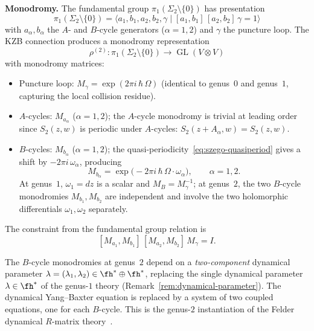 \smallskip
\noindent
\textbf{Monodromy.}
The fundamental group
$\pi_1(\Sigma_2 \setminus \{0\})$ has presentation
\begin{equation}\label{eq:fund-gp-g2}
  \pi_1(\Sigma_2 \setminus \{0\})
  = \bigl\langle
  a_1, b_1, a_2, b_2, \gamma
  \;\big|\;
  [a_1, b_1]\,[a_2, b_2]\,\gamma = 1
  \bigr\rangle
\end{equation}
with $a_\alpha, b_\alpha$ the $A$- and $B$-cycle
generators ($\alpha = 1, 2$) and $\gamma$ the puncture
loop. The KZB connection produces a monodromy
representation
\begin{equation}\label{eq:monodromy-rep-g2}
  \rho^{(2)} \colon
  \pi_1(\Sigma_2 \setminus \{0\})
  \to \operatorname{GL}(V \otimes V)
\end{equation}
with monodromy matrices:
\begin{itemize}
\item Puncture loop:
  $M_\gamma = \exp(2\pi i\,\hbar\,\Omega)$
  (identical to genus~$0$ and genus~$1$, capturing
  the local collision residue).
\item $A$-cycles:
  $M_{a_\alpha}$ ($\alpha = 1, 2$); the $A$-cycle
  monodromy is trivial at leading order since
  $S_2(z, w)$ is periodic under $A$-cycles:
  $S_2(z + A_\alpha, w) = S_2(z, w)$.
\item $B$-cycles:
  $M_{b_\alpha}$ ($\alpha = 1, 2$); the
  quasi-periodicity~\eqref{eq:szego-quasiperiod} gives
  a shift by $-2\pi i\,\omega_\alpha$, producing
  \begin{equation}\label{eq:b-monodromy-g2}
    M_{b_\alpha}
    = \exp\!\bigl(-2\pi i\,\hbar\,
    \Omega \cdot \omega_\alpha\bigr),
    \qquad \alpha = 1, 2.
  \end{equation}
  At genus~$1$, $\omega_1 = dz$ is a scalar and
  $M_B = M_\gamma^{-1}$; at genus~$2$, the two $B$-cycle
  monodromies $M_{b_1}, M_{b_2}$ are independent and
  involve the two holomorphic differentials
  $\omega_1, \omega_2$ separately.
\end{itemize}
The constraint from the fundamental group relation is
\begin{equation}\label{eq:constraint-g2}
  [M_{a_1}, M_{b_1}]\,
  [M_{a_2}, M_{b_2}]\,
  M_\gamma = I.
\end{equation}

\begin{remark}
\label{rem:dynamical-g2}
The $B$-cycle monodromies at genus~$2$ depend on a
\emph{two-component} dynamical parameter
$\lambda = (\lambda_1, \lambda_2) \in \fh^* \oplus \fh^*$,
replacing the single dynamical parameter $\lambda \in \fh^*$
of the genus-$1$ theory
(Remark~\textup{\ref{rem:dynamical-parameter}}).
The dynamical Yang--Baxter equation is replaced by a
system of two coupled equations, one for each $B$-cycle.
This is the genus-$2$ instantiation of the Felder dynamical
$R$-matrix theory~\cite{Felder94,FelderVarchenko96}.
\end{remark}

